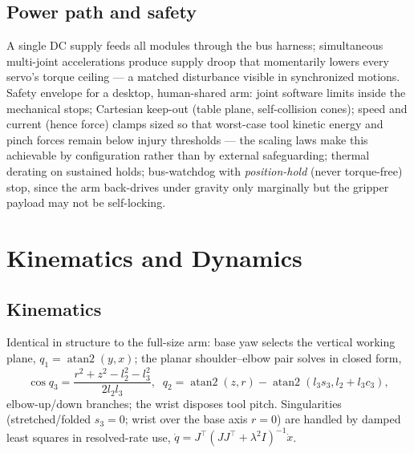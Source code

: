 \documentclass[conference]{IEEEtran}
\begin{document}
\subsection{Power path and safety}
A single DC supply feeds all modules through the bus harness; simultaneous multi-joint accelerations produce supply droop that momentarily lowers every servo's torque ceiling --- a matched disturbance visible in synchronized motions. Safety envelope for a desktop, human-shared arm: joint software limits inside the mechanical stops; Cartesian keep-out (table plane, self-collision cones); speed and current (hence force) clamps sized so that worst-case tool kinetic energy and pinch forces remain below injury thresholds --- the scaling laws make this achievable by configuration rather than by external safeguarding; thermal derating on sustained holds; bus-watchdog with \emph{position-hold} (never torque-free) stop, since the arm back-drives under gravity only marginally but the gripper payload may not be self-locking.

\section{Kinematics and Dynamics}
\subsection{Kinematics}
Identical in structure to the full-size arm: base yaw selects the vertical working plane, $q_1 = \operatorname{atan2}(y, x)$; the planar shoulder--elbow pair solves in closed form,
\begin{equation}
\cos q_3 = \frac{r^2 + z^2 - l_2^2 - l_3^2}{2 l_2 l_3},\;\;
q_2 = \operatorname{atan2}(z, r) - \operatorname{atan2}(l_3 s_3, l_2 + l_3 c_3),
\end{equation}
elbow-up/down branches; the wrist disposes tool pitch. Singularities (stretched/folded $s_3 = 0$; wrist over the base axis $r = 0$) are handled by damped least squares in resolved-rate use, $\dot q = J^{\!\top}(JJ^{\!\top} + \lambda^2 I)^{-1}\dot x$.
\end{document}
